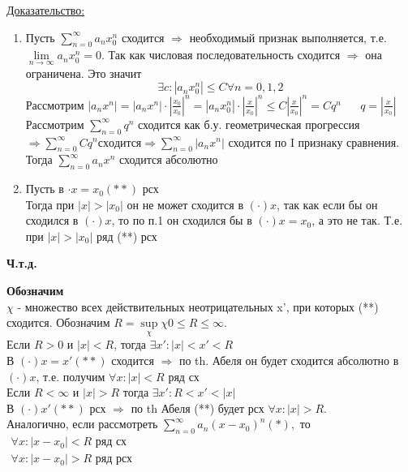 \documentclass[12pt]{article}
\let\oldsum\sum
\let\oldlim\lim
\renewcommand{\sum}{\oldsum\limits}
\renewcommand{\lim}{\oldlim\limits}
\begin{document}
    \underline{Доказательство:}
    \begin{adjustwidth}{1.5em}{1.5em}
      \begin{enumerate}
        \item Пусть $\sum_{n=0}^{\infty}a_n x^n_0$ сходится $\Rightarrow$ необходимый признак выполняется,
        т.е. $\lim_{n \to \infty} a_n x_0^n=0$. Так как числовая последовательность сходится $\Rightarrow$ она ограничена.
        Это значит \[\exists c: |a_n x_0^n|\leq C \forall n=0,1,2\]
        Рассмотрим $|a_n x^n|=|a_n x^n|\cdot |\frac{x_0}{x_0}|^n = |a_n x_0^n|\cdot |\frac{x}{x_0}|^n\leq C |\frac{x}{x_0}|^n=Cq^n \hspace{20pt} q= |\frac{x}{x_0}|$\\
        Рассмотрим $\sum_{n=0}^{\infty} q^n$ сходится как б.у. геометрическая прогрессия $\Rightarrow \sum_{n=0}^{\infty}
        C q^n сходится \Rightarrow \sum_{n=0}^{\infty} |a_n x^n|$ сходится по I признаку сравнения.
        Тогда $\sum_{n=0}^{\infty} a_n x^n$ сходится абсолютно
        \item  Пусть в $\cdot x=x_0(**)$ рсх\\
        Тогда при $|x|>|x_0|$ он не может сходится в $(\cdot)x$, так как если бы он сходился в 
        $(\cdot)x$, то по п.1 он сходился бы в $(\cdot) x=x_0$, а это не так. Т.е. при $|x|>|x_0|$ ряд (**) рсх
      \end{enumerate}
    \end{adjustwidth}
    \begin{center}
      \textbf{Ч.т.д.}
    \end{center}

    \textbf{Обозначим}\\
    $\chi$ - множество всех действительных неотрицательных x', при которых (**) сходится. Обозначим $R=\underset{\chi}{\sup}
    \chi 0 \leq R \leq \infty$.\\
    Если $R>0$ и $|x|<R$, тогда $\exists x':|x|<x'<R$\\
    В $(\cdot) x=x'(**)$ сходится $\Rightarrow$ по th. Абеля он будет сходится абсолютно в $(\cdot) x$,
    т.е. получим $\forall x: |x|<R$ ряд сх\\
    Если $R< \infty$ и $|x|>R$ тогда $\exists x': R<x'<|x|$\\
    В $(\cdot) x'(**)$ рсх $\Rightarrow$ по th Абеля (**) будет рсх $\forall x: |x|>R$.\\
    Аналогично, если рассмотреть $\sum_{n=0}^{\infty}a_n(x-x_0)^n(*),$ то
    $\begin{matrix}
      \forall x:|x-x_0|<R \text{ ряд сх}\\
      \forall x:|x-x_0|>R \text{ ряд рсх}
    \end{matrix}$ \\
\end{document}
